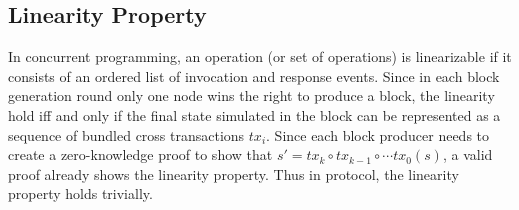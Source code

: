 



\subsection{Linearity Property}
In concurrent programming, an operation (or set of operations) is linearizable if it consists of an ordered list of invocation and response events. Since in each block generation round only one node wins the right to produce a block, the linearity hold iff and only if the final state simulated in the block can be represented as a sequence of bundled cross transactions $tx_i$. Since each block producer needs to create a zero-knowledge proof to show that $s' = tx_k \circ tx_{k-1} \circ \cdots tx_0(s)$, a valid proof already shows the linearity property. Thus in \dprotocol protocol, the linearity property holds trivially. 
